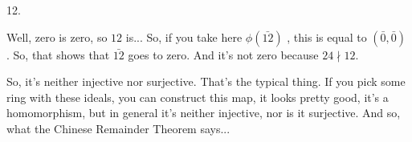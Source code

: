 \begin{student}
12.
\end{student}

\begin{speech}[00:04:51 - 00:05:25]
Well, zero is zero, so $12$ is... So, if you take here $\phi(\bar{12})$ , this is equal to $(\bar{0}, \bar{0})$ . So, that shows that $\bar{12}$ goes to zero. And it's not zero because $24 \nmid 12$.

So, it's neither injective nor surjective. That's the typical thing. If you pick some ring with these ideals, you can construct this map, it looks pretty good, it's a homomorphism, but in general it's neither injective, nor is it surjective. And so, what the Chinese Remainder Theorem says...
\end{speech}

